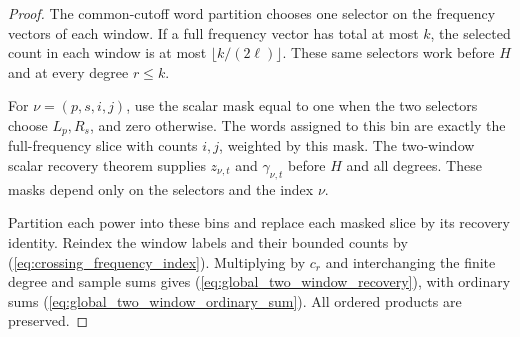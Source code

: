 \begin{proof}\leanok
    The common-cutoff word partition chooses one selector on the frequency
    vectors of each window. If a full frequency vector has total at most $k$,
    the selected count in each window is at most
    $\lfloor k/(2\ell)\rfloor$. These same selectors work before $H$ and at
    every degree $r\le k$.

    For $\nu=(p,s,i,j)$, use the scalar mask equal to one when the two selectors
    choose $L_p,R_s$, and zero otherwise. The words assigned to this bin are
    exactly the full-frequency slice with counts $i,j$, weighted by this mask.
    The two-window scalar recovery theorem supplies $z_{\nu,t}$ and
    $\gamma_{\nu,t}$ before $H$ and all degrees. These masks depend only on
    the selectors and the index $\nu$.

    Partition each power into these bins and replace each masked slice by its
    recovery identity. Reindex the window labels and their bounded counts by
    (\ref{eq:crossing_frequency_index}). Multiplying by $c_r$ and interchanging
    the finite degree and sample sums gives
    (\ref{eq:global_two_window_recovery}), with ordinary sums
    (\ref{eq:global_two_window_ordinary_sum}). All ordered products are preserved.
\end{proof}
